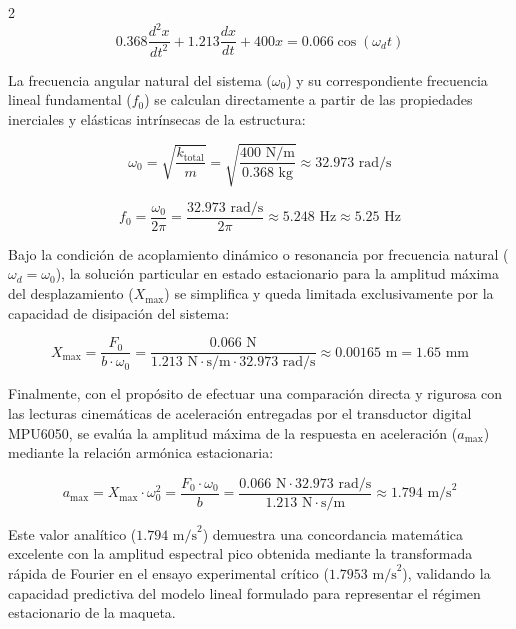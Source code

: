 \documentclass[10pt]{article}
\begin{document}
\begin{multicols}{2}
\begin{equation}
0.368\frac{d^2x}{dt^2} + 1.213\frac{dx}{dt} + 400x = 0.066\cos(\omega_d t)
\end{equation}

La frecuencia angular natural del sistema ($\omega_0$) y su correspondiente frecuencia lineal fundamental ($f_0$) se calculan directamente a partir de las propiedades inerciales y elásticas intrínsecas de la estructura:

\begin{equation}
\omega_0 = \sqrt{\frac{k_{\text{total}}}{m}} = \sqrt{\frac{400 \text{ N/m}}{0.368 \text{ kg}}} \approx 32.973 \text{ rad/s}
\end{equation}

\begin{equation}
f_0 = \frac{\omega_0}{2\pi} = \frac{32.973 \text{ rad/s}}{2\pi} \approx 5.248 \text{ Hz} \approx 5.25 \text{ Hz}
\end{equation}

Bajo la condición de acoplamiento dinámico o resonancia por frecuencia natural ($\omega_d = \omega_0$), la solución particular en estado estacionario para la amplitud máxima del desplazamiento ($X_{\text{max}}$) se simplifica y queda limitada exclusivamente por la capacidad de disipación del sistema:

\begin{equation}
X_{\text{max}} = \frac{F_0}{b \cdot \omega_0} = \frac{0.066 \text{ N}}{1.213 \text{ N}\cdot\text{s/m} \cdot 32.973 \text{ rad/s}} \approx 0.00165 \text{ m} = 1.65 \text{ mm}
\end{equation}

Finalmente, con el propósito de efectuar una comparación directa y rigurosa con las lecturas cinemáticas de aceleración entregadas por el transductor digital MPU6050, se evalúa la amplitud máxima de la respuesta en aceleración ($a_{\text{max}}$) mediante la relación armónica estacionaria:

\begin{equation}
a_{\text{max}} = X_{\text{max}} \cdot \omega_0^2 = \frac{F_0 \cdot \omega_0}{b} = \frac{0.066 \text{ N} \cdot 32.973 \text{ rad/s}}{1.213 \text{ N}\cdot\text{s/m}} \approx 1.794 \text{ m/s}^2
\end{equation}

Este valor analítico ($1.794 \text{ m/s}^2$) demuestra una concordancia matemática excelente con la amplitud espectral pico obtenida mediante la transformada rápida de Fourier en el ensayo experimental crítico ($1.7953 \text{ m/s}^2$), validando la capacidad predictiva del modelo lineal formulado para representar el régimen estacionario de la maqueta.


\end{multicols}
\end{document}
